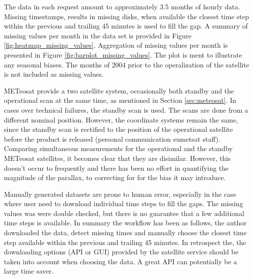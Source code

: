 The data in each request amount to approximately 3.5 months of hourly data. Missing timestamps, results in missing disks, when available the closest time step within the previous and trailing 45 minutes is used to fill the gap. A summary of missing values per month in the data set is provided in Figure \ref{fig:heatmap_missing_values}. Aggregation of missing values per month is presented in Figure \ref{fig:barplot_missing_values}. The plot is ment to illustrate any seasonal biases. The months of 2004 prior to the operalization of the satellite is not included as missing values.

METeosat provide a two satellite system, occasionally both standby and the operational scan at the same time, as mentioned in Section \ref{sec:meteosat}.
In cases over technical failures, the standby scan is used. The scans are done from a different nominal position. However, the coordinate systems remain the same, since the standby scan is rectified to the position of the operational satellite before the product is released (personal communication \acrshort{eumetsat} staff). Comparing simultaneous measurements for the operational and the standby METeosat satellites, it becomes clear that they are disimilar. However, this doesn't occur to frequently and there has been no effort in quantifying the magnitude of the parallax, to correcting for for the bias it may introduce.

Manually generated datasets are prone to human error, especially in the case where user need to download individual time steps to fill the gaps. The missing values was were double checked, but there is no guarantee that a few additional time steps is available. In summary the workflow has been as follows, the author downloaded the data, detect missing times and manually choose the closest time step available within the previous and trailing 45 minutes. In retrospect the, the downloading options (API or GUI) provided by the satellite service should be taken into account when choosing the data. A great API can potentially be a large time saver.

